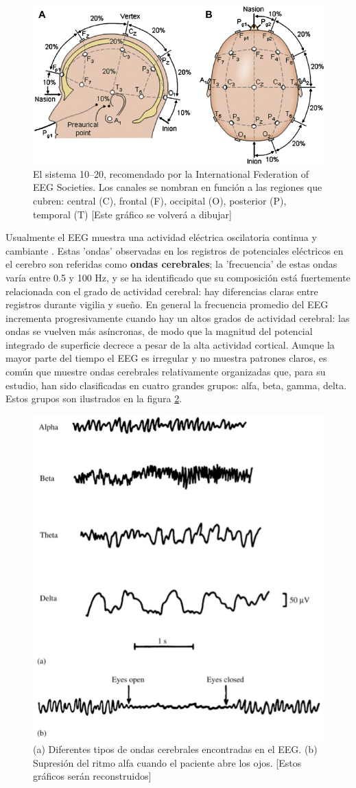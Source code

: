 \documentclass[12pt,a4paper]{mitthesis}
\begin{document}
\begin{figure}
\centering
\includegraphics[width=0.9\linewidth]{Fig.png} 
\caption{El sistema 10--20, recomendado por la
International Federation of EEG Societies. Los canales se nombran en funci\'on a las regiones que 
cubren: central (C), frontal (F), occipital (O), posterior (P), temporal (T) 
[Este gr\'afico se volver\'a a dibujar]
}
\label{img1020}
\end{figure}

Usualmente el EEG muestra una actividad el\'ectrica oscilatoria continua y cambiante 
\cite{Clark98}.
Estas 'ondas' observadas en los registros de potenciales el\'ectricos en el cerebro son referidas 
como \textbf{ondas cerebrales}; la 'frecuencia' de estas ondas var\'ia entre 0.5 y 100 Hz, y se ha 
identificado que su composici\'on est\'a fuertemente relacionada con el grado de actividad 
cerebral: hay diferencias claras entre registros durante vigilia y sue\~no.
En general la frecuencia promedio del EEG incrementa progresivamente cuando hay un altos grados 
de actividad cerebral: las ondas se vuelven m\'as as\'incronas, de modo que la magnitud del 
potencial integrado de superficie decrece a pesar de la alta actividad cortical.
Aunque la mayor parte del tiempo el EEG es irregular y no muestra patrones claros, es com\'un que 
muestre ondas cerebrales relativamente organizadas que, para su estudio, han sido clasificadas en 
cuatro grandes grupos: alfa, beta, gamma, delta.
Estos grupos son ilustrados en la figura \ref{ritmos}.

\begin{figure}
\centering
\includegraphics[width=0.5\linewidth]{figura_4.png} 
\caption{(a) Diferentes tipos de ondas cerebrales encontradas en el EEG. (b) Supresi\'on del ritmo 
alfa cuando el paciente abre los ojos.
[Estos gr\'aficos ser\'an reconstruidos]
}
\label{ritmos}
\end{figure}
\end{document}
